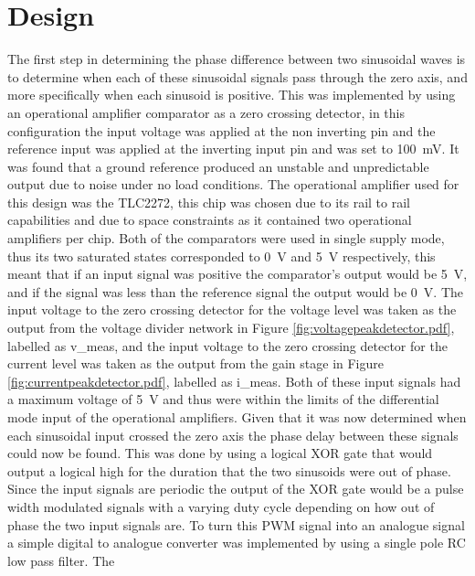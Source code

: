\section{Design} \label{sec:design_linear}
The first step in determining the phase difference between two sinusoidal waves is to determine when each of these sinusoidal signals pass through the zero axis, and more specifically when each sinusoid is positive. This was implemented by using an operational amplifier comparator as a zero crossing detector, in this configuration the input voltage was applied at the non inverting pin and the reference input was applied at the inverting input pin and was set to \SI{100}{\milli \volt}. It was found that a ground reference produced an unstable and unpredictable output due to noise under no load conditions. The operational amplifier used for this design was the TLC2272, this chip was chosen due to its rail to rail capabilities and due to space constraints as it contained two operational amplifiers per chip. Both of the comparators were used in single supply mode, thus its two saturated states corresponded to \SI{0}{\volt} and \SI{5}{\volt} respectively, this meant that if an input signal was positive the comparator's output would be \SI{5}{\volt}, and if the signal was less than the reference signal the output would be \SI{0}{\volt}. The input voltage to the zero crossing detector for the voltage level was taken as the output from the voltage divider network in Figure \ref{fig:voltagepeakdetector.pdf}, labelled as v\_meas, and the input voltage to the zero crossing detector for the current level was taken as the output from the gain stage in Figure \ref{fig:currentpeakdetector.pdf}, labelled as i\_meas. Both of these input signals had a maximum voltage of \SI{5}{\volt} and thus were within the limits of the differential mode input of the operational amplifiers. Given that it was now determined when each sinusoidal input crossed the zero axis the phase delay between these signals could now be found. This was done by using a logical XOR gate that would output a logical high for the duration that the two sinusoids were out of phase. Since the input signals are periodic the output of the XOR gate would be a pulse width modulated signals with a varying duty cycle depending on how out of phase the two input signals are.
To turn this PWM signal into an analogue signal a simple digital to analogue converter was implemented by using a single pole RC low pass filter. The   

